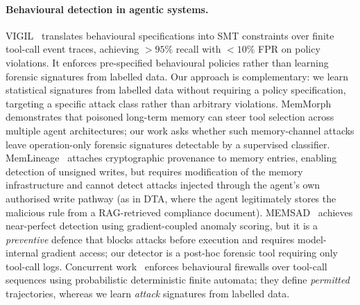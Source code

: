 \documentclass{article}
\begin{document}
\paragraph{Behavioural detection in agentic systems.} VIGIL~\citep{li2026vigil} translates behavioural specifications into SMT constraints over finite tool-call event traces, achieving $>95\%$ recall with $<10\%$ FPR on policy violations. It enforces pre-specified behavioural policies rather than learning forensic signatures from labelled data. Our approach is complementary: we learn statistical signatures from labelled data without requiring a policy specification, targeting a specific attack class rather than arbitrary violations. MemMorph~\citep{zhang2026memmorph} demonstrates that poisoned long-term memory can steer tool selection across multiple agent architectures; our work asks whether such memory-channel attacks leave operation-only forensic signatures detectable by a supervised classifier. MemLineage~\citep{ouyang2026memlineage} attaches cryptographic provenance to memory entries, enabling detection of unsigned writes, but requires modification of the memory infrastructure and cannot detect attacks injected through the agent's own authorised write pathway (as in DTA, where the agent legitimately stores the malicious rule from a RAG-retrieved compliance document). MEMSAD~\citep{gowda2026memsad} achieves near-perfect detection using gradient-coupled anomaly scoring, but it is a \emph{preventive} defence that blocks attacks before execution and requires model-internal gradient access; our detector is a post-hoc forensic tool requiring only tool-call logs. Concurrent work~\citep{dang2026enforcing} enforces behavioural firewalls over tool-call sequences using probabilistic deterministic finite automata; they define \emph{permitted} trajectories, whereas we learn \emph{attack} signatures from labelled data.
\end{document}
